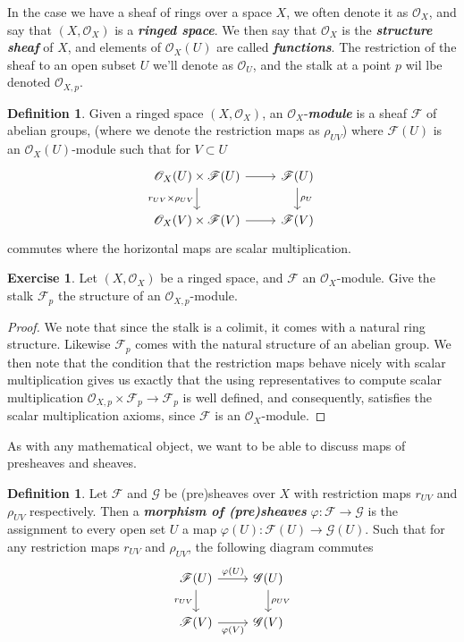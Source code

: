 \documentclass[psamsfonts]{amsart}
\theoremstyle{definition}
\newtheorem{defn}[thm]{Definition}
\newtheorem{exer}[thm]{Exercise}
\theoremstyle{remark}
\newcommand{\ib}[1]{\textbf{\textit{#1}}}
\begin{document}
%
In the case we have a sheaf of rings over a space $X$, we often denote it as $\mathscr{O}_X$, and say that $(X, \mathscr{O}_X)$ is a \ib{ringed space}. We then say that $\mathscr{O}_X$ is the \ib{structure sheaf} of $X$, and elements of $\mathscr{O}_X(U)$ are called \ib{functions}. The restriction of the sheaf to an open subset $U$ we'll denote as $\mathscr{O}_U$, and the stalk at a point $p$ wil lbe denoted $\mathscr{O}_{X,p}$.
% 
\begin{defn}
Given a ringed space $(X,\mathscr{O}_X)$, an $\mathscr{O}_X$-\ib{module} is a sheaf $\mathscr{F}$ of abelian groups, (where we denote the restriction maps as $\rho_{UV}$) where $\mathscr{F}(U)$ is an $\mathscr{O}_X(U)$-module such that for $V \subset U$
$$\begin{tikzcd}
\mathscr{O}_X(U) \times \mathscr{F}(U) \ar[d, "r_{UV} \times \rho_{UV}"']\ar[r] & \mathscr{F}(U) \ar[d, "\rho_U"] \\
\mathscr{O}_X(V) \times \mathscr{F}(V) \ar[r] & \mathscr{F}(V)
\end{tikzcd}$$
commutes where the horizontal maps are scalar multiplication.
\end{defn}
%
\begin{exer}
Let $(X,\mathscr{O}_X)$ be a ringed space, and $\mathscr{F}$ an $\mathscr{O}_X$-module. Give the stalk $\mathscr{F}_p$ the structure of an $\mathscr{O}_{X,p}$-module.
\end{exer}
%
\begin{proof}
We note that since the stalk is a colimit, it comes with a natural ring structure. Likewise $\mathscr{F}_p$ comes with the natural structure of an abelian group. We then note that the condition that the restriction maps behave nicely with scalar multiplication gives us exactly that the using representatives to compute scalar multiplication $\mathscr{O}_{X,p} \times \mathscr{F}_p \to \mathscr{F}_p$ is well defined, and consequently, satisfies the scalar multiplication axioms, since $\mathscr{F}$ is an $\mathscr{O}_X$-module. 
\end{proof}
%
As with any mathematical object, we want to be able to discuss maps of presheaves and sheaves.
%
\begin{defn}
Let $\mathscr{F}$ and $\mathscr{G}$ be (pre)sheaves over $X$ with restriction maps $r_{UV}$ and $\rho_{UV}$ respectively. Then a \ib{morphism of (pre)sheaves} $\varphi : \mathscr{F} \to \mathscr{G}$ is the assignment to every open set $U$ a map $\varphi(U) : \mathscr{F}(U) \to \mathscr{G}(U)$. Such that for any restriction maps $r_{UV}$ and $\rho_{UV}$, the following diagram commutes
$$\begin{tikzcd}
\mathscr{F}(U) \ar[d, "r_{UV}"']\ar[r, "\varphi(U)"] & \mathscr{G}(U) \ar[d, "\rho_{UV}"] \\
\mathscr{F}(V) \ar[r, "\varphi(V)"'] & \mathscr{G}(V)
\end{tikzcd}$$
\end{defn}
\end{document}
